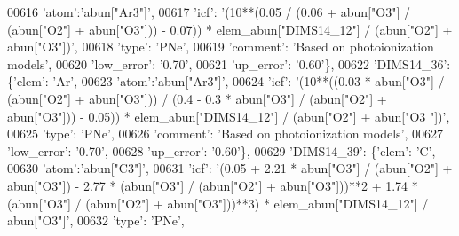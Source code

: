 \begin{DoxyCode}
00616                                        \textcolor{stringliteral}{'atom'}:\textcolor{stringliteral}{'abun["Ar3"]'}, 
00617                                        \textcolor{stringliteral}{'icf'}: \textcolor{stringliteral}{'(10**(0.05 / (0.06 + abun["O3"] / (abun["O2"] + abun["O3"]))
       - 0.07)) * elem\_abun["DIMS14\_12"] / (abun["O2"] + abun["O3"])'},
00618                                        \textcolor{stringliteral}{'type'}: \textcolor{stringliteral}{'PNe'},
00619                                        \textcolor{stringliteral}{'comment'}: \textcolor{stringliteral}{'Based on photoionization models'},
00620                                        \textcolor{stringliteral}{'low\_error'}: \textcolor{stringliteral}{'0.70'},
00621                                        \textcolor{stringliteral}{'up\_error'}: \textcolor{stringliteral}{'0.60'}\},
00622                          \textcolor{stringliteral}{'DIMS14\_36'}: \{\textcolor{stringliteral}{'elem'}: \textcolor{stringliteral}{'Ar'},
00623                                        \textcolor{stringliteral}{'atom'}:\textcolor{stringliteral}{'abun["Ar3"]'}, 
00624                                        \textcolor{stringliteral}{'icf'}: \textcolor{stringliteral}{'(10**((0.03  * abun["O3"] / (abun["O2"] + abun["O3"])) /
       (0.4 - 0.3 * abun["O3"] / (abun["O2"] + abun["O3"])) - 0.05)) * elem\_abun["DIMS14\_12"] / (abun["O2"] + abun["O3
      "])'},
00625                                        \textcolor{stringliteral}{'type'}: \textcolor{stringliteral}{'PNe'},
00626                                        \textcolor{stringliteral}{'comment'}: \textcolor{stringliteral}{'Based on photoionization models'},
00627                                        \textcolor{stringliteral}{'low\_error'}: \textcolor{stringliteral}{'0.70'},
00628                                        \textcolor{stringliteral}{'up\_error'}: \textcolor{stringliteral}{'0.60'}\},
00629                          \textcolor{stringliteral}{'DIMS14\_39'}: \{\textcolor{stringliteral}{'elem'}: \textcolor{stringliteral}{'C'},
00630                                        \textcolor{stringliteral}{'atom'}:\textcolor{stringliteral}{'abun["C3"]'}, 
00631                                        \textcolor{stringliteral}{'icf'}: \textcolor{stringliteral}{'(0.05 + 2.21 * abun["O3"] / (abun["O2"] + abun["O3"]) - 2.77
       * (abun["O3"] / (abun["O2"] + abun["O3"]))**2 + 1.74 * (abun["O3"] / (abun["O2"] + abun["O3"]))**3) *
       elem\_abun["DIMS14\_12"] / abun["O3"]'},
00632                                        \textcolor{stringliteral}{'type'}: \textcolor{stringliteral}{'PNe'},

\end{DoxyCode}
